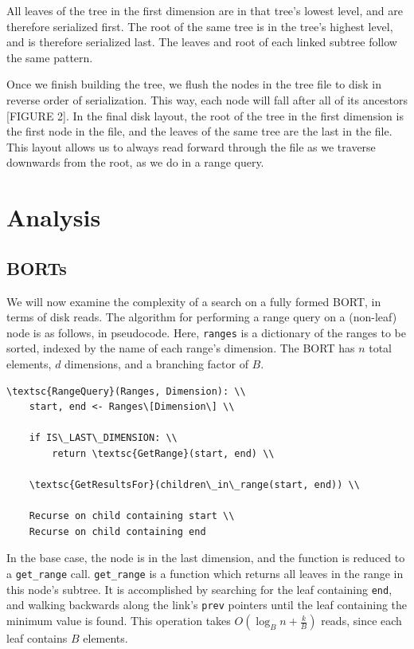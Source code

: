 \documentclass[11pt, oneside]{article}
\newcommand{\ms}{\texttt}
\begin{document}
All leaves of the tree in the first dimension are in that tree's lowest level,
and are therefore serialized first. The root of the same tree is in the tree's
highest level, and is therefore serialized last. The leaves and root of each
linked subtree follow the same pattern. 

Once we finish building the tree, we flush the nodes in the tree file to disk
in reverse order of serialization. This way, each node will fall after all of
its ancestors [FIGURE 2]. In the final disk layout, the root of the tree in the
first dimension is the first node in the file, and the leaves of the same tree
are the last in the file. This layout allows us to always read forward through
the file as we traverse downwards from the root, as we do in a range query.

\section{Analysis}


\subsection{BORTs}

We will now examine the complexity of a search on a fully formed BORT, in terms
of disk reads. The algorithm for performing a range query on a (non-leaf) node
is as follows, in pseudocode. Here, \ms{ranges} is a dictionary of the
ranges to be sorted, indexed by the name of each range's dimension. The BORT has
$n$ total elements, $d$ dimensions, and a branching factor of $B$.

\begin{verbatim}
\textsc{RangeQuery}(Ranges, Dimension): \\
    start, end <- Ranges\[Dimension\] \\
    
    if IS\_LAST\_DIMENSION: \\
        return \textsc{GetRange}(start, end) \\

    \textsc{GetResultsFor}(children\_in\_range(start, end)) \\

    Recurse on child containing start \\
    Recurse on child containing end
\end{verbatim}

In the base case, the node is in the last dimension, and the function is reduced
to a \ms{get\_range} call. \ms{get\_range} is a function which returns all
leaves in the range in this node's subtree. It is accomplished by searching for
the leaf containing \ms{end}, and walking backwards along the link's \ms{prev}
pointers until the leaf containing the minimum value is found. This operation
takes $O(\log_B n + \frac{k}{B})$ reads, since each leaf contains $B$ elements.
\end{document}
